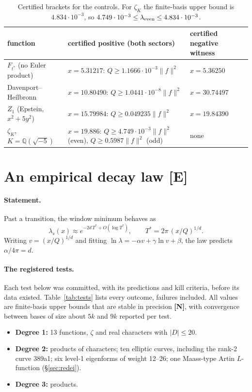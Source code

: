 \documentclass[11pt]{article}
\theoremstyle{remark}
\newcommand{\tagE}{\textbf{[E]}}
\newcommand{\tagN}{\textbf{[N]}}
\begin{document}
\begin{table}[h]
\centering\small
\begin{tabular}{@{}p{3.6cm}p{6.6cm}p{3.6cm}@{}}
\toprule
function & certified positive (both sectors) & certified negative witness\\
\midrule
$F_{t^*}$ (no Euler product) & $x=5.31217$: $Q\ge1.1666\cdot10^{-3}\|f\|^2$ & $x=5.36250$\\
Davenport--Heilbronn & $x=10.80490$: $Q\ge1.0441\cdot10^{-8}\|f\|^2$ & $x=30.74497$\\
$Z_1$ (Epstein, $x^2+5y^2$) & $x=15.79984$: $Q\ge0.049235\|f\|^2$ & $x=19.84390$\\
$\zeta_K$, $K=\mathbb Q(\sqrt{-5})$ & $x=19.886$: $Q\ge4.749\cdot10^{-3}\|f\|^2$ (even), $Q\ge0.5987\|f\|^2$ (odd) & none\\
\bottomrule
\end{tabular}
\caption{Certified brackets for the controls. For $\zeta_K$ the finite-basis upper bound is $4.834\cdot10^{-3}$, so $4.749\cdot10^{-3}\le\lambda_{\rm even}\le4.834\cdot10^{-3}$.}\label{tab:controls}
\end{table}

\section{An empirical decay law \tagE}\label{sec:decay}

\paragraph{Statement.} Past a transition, the window minimum behaves as
\[
\lambda_s(x)\approx e^{-2d\,T^*+O(\log T^*)},\qquad T^*=2\pi\,(x/Q)^{1/d}.
\]
Writing $v=(x/Q)^{1/d}$ and fitting $\ln\lambda=-\alpha v+\gamma\ln v+\beta$, the law predicts $\alpha/4\pi=d$.

\paragraph{The registered tests.} Each test below was committed, with its predictions and kill criteria, before its data existed. Table~\ref{tab:tests} lists every outcome, failures included. All values are finite-basis upper bounds that are stable in precision \tagN, with convergence between bases of size about $5k$ and $9k$ reported per test.
\begin{itemize}
\item \textbf{Degree 1:} 13 functions, $\zeta$ and real characters with $|D|\le20$.
\item \textbf{Degree 2:} products of characters; ten elliptic curves, including the rank-2 curve 389a1; six level-1 eigenforms of weight 12--26; one Maass-type Artin $L$-function (\S\ref{sec:redei}).
\item \textbf{Degree 3:} products.
\end{itemize}
\end{document}
